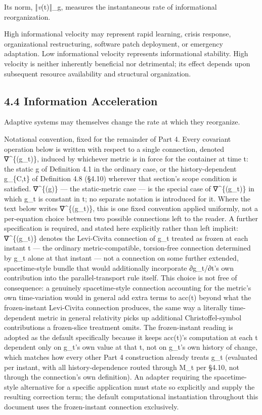 \documentclass[
]{article}
\begin{document}
Its norm, ‖\emph{v}(t)‖\_g, measures the instantaneous rate of
informational reorganization.

High informational velocity may represent rapid learning, crisis
response, organizational restructuring, software patch deployment, or
emergency adaptation. Low informational velocity represents
informational stability. High velocity is neither inherently beneficial
nor detrimental; its effect depends upon subsequent resource
availability and structural organization.

\hypertarget{information-acceleration}{%
\subsection{4.4 Information
Acceleration}\label{information-acceleration}}

Adaptive systems may themselves change the rate at which they
reorganize.

Notational convention, fixed for the remainder of Part 4. Every
covariant operation below is written with respect to a single
connection, denoted ∇\^{}\{(g\_t)\}, induced by whichever metric is in
force for the container at time t: the static g of Definition 4.1 in the
ordinary case, or the history-dependent g\_\{C,t\} of Definition 4.8
(§4.10) wherever that section's scope condition is satisfied.
∇\^{}\{(g)\} --- the static-metric case --- is the special case of
∇\^{}\{(g\_t)\} in which g\_t is constant in t; no separate notation is
introduced for it. Where the text below writes ∇\^{}\{(g\_t)\}, this is
one fixed convention applied uniformly, not a per-equation choice
between two possible connections left to the reader. A further
specification is required, and stated here explicitly rather than left
implicit: ∇\^{}\{(g\_t)\} denotes the Levi-Civita connection of g\_t
treated as frozen at each instant t --- the ordinary metric-compatible,
torsion-free connection determined by g\_t alone at that instant --- not
a connection on some further extended, spacetime-style bundle that would
additionally incorporate ∂g\_t/∂t's own contribution into the
parallel-transport rule itself. This choice is not free of consequence:
a genuinely spacetime-style connection accounting for the metric's own
time-variation would in general add extra terms to acc(t) beyond what
the frozen-instant Levi-Civita connection produces, the same way a
literally time-dependent metric in general relativity picks up
additional Christoffel-symbol contributions a frozen-slice treatment
omits. The frozen-instant reading is adopted as the default specifically
because it keeps acc(t)'s computation at each t dependent only on g\_t's
own value at that t, not on g\_t's own history of change, which matches
how every other Part 4 construction already treats g\_t (evaluated per
instant, with all history-dependence routed through M\_t per §4.10, not
through the connection's own definition). An adapter requiring the
spacetime-style alternative for a specific application must state so
explicitly and supply the resulting correction term; the default
computational instantiation throughout this document uses the
frozen-instant connection exclusively.
\end{document}
